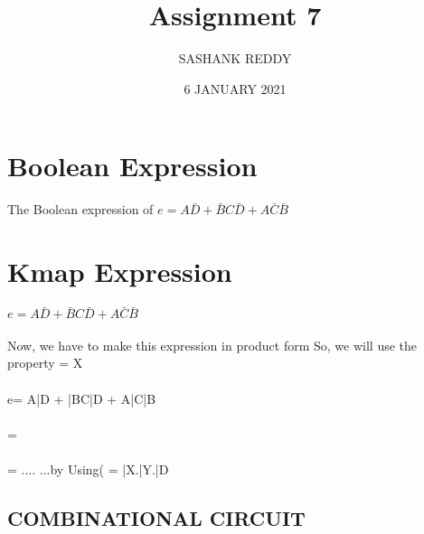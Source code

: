 \documentclass{article}
\begin{document}
\title{
Assignment 7
}
\author{SASHANK REDDY}

\date{6 JANUARY 2021}
\maketitle


\section{Boolean Expression}
The Boolean expression of $e = A\bar{D} + \bar{B}C\bar{D} + A\bar{C}\bar{B}$ \\ 
\section{Kmap Expression}
$e=  A\bar{D} + \bar{B}C\bar{D} + A\bar{C}\bar{B}$ \\
\\
Now, we have to make this expression in product form
So, we will use the property  = X\\
\\
e= A\bar{D} + \bar{B}C\bar{D} + A\bar{C}\bar{B} \\
\\
 =  \\
\\
             = ....         ...by Using( = \bar{X}.\bar{Y}.\bar{D}




\subsection{COMBINATIONAL CIRCUIT}
\end{document}
